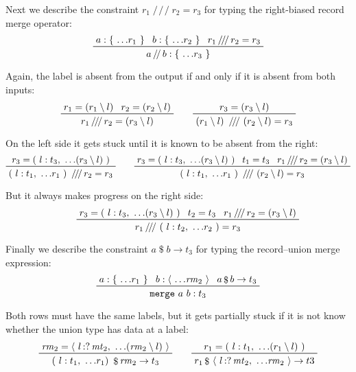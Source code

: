 \documentclass[11pt, twoside, reqno]{book}
\providecommand{\lcurvyangle}{\langle}
\providecommand{\rcurvyangle}{\rangle}
\begin{document}
Next we describe the constraint $r_1 \mathop{/\!/\!/} r_2 = r_3$ for typing the right-biased record merge operator:
\begin{displaymath}
\prftree{a : \{\ \dots\!r_1\ \}}{b : \{\ \dots\!r_2\ \}}{r_1 \mathop{/\!/\!/} r_2 = r_3}{a \mathop{/\!/} b : \{\ \dots\!r_3\ \}}
\end{displaymath}

Again, the label is absent from the output if and only if it is absent from both inputs:
\begin{displaymath}
\prftree{r_1 = (r_1 \setminus l)}{r_2 = (r_2 \setminus l)}{r_1 \mathop{/\!/\!/} r_2 = (r_3 \setminus l)}
\qquad
\prftree{r_3 = (r_3 \setminus l)}{(r_1 \setminus l)\ \mathop{/\!/\!/}\ (r_2 \setminus l) = r_3}
\end{displaymath}

On the left side it gets stuck until it is known to be absent from the right:
\begin{displaymath}
\prftree
  {r_3 = (\ l : t_3,\ \dots\!(r_3 \setminus l)\ )}
  {(\ l : t_1,\ \dots\!r_1\ )\ \mathop{/\!/\!/} r_2 = r_3}
\qquad
\prftree
  {r_3 = (\ l : t_3,\ \dots\!(r_3 \setminus l)\ )}
  {t_1 = t_3}
  {r_1 \mathop{/\!/\!/} r_2 = (r_3 \setminus l)}
  {(\ l : t_1,\ \dots\!r_1\ )\ \mathop{/\!/\!/}\ (r_2 \setminus l) = r_3}
\end{displaymath}

But it always makes progress on the right side:
\begin{displaymath}
\qquad
\prftree
  {r_3 = (\ l : t_3,\ \dots\!(r_3 \setminus l)\ )}
  {t_2 = t_3}
  {r_1 \mathop{/\!/\!/} r_2 = (r_3 \setminus l)}
  {r_1 \mathop{/\!/\!/}\ (\ l : t_2,\ \dots\!r_2\ ) = r_3}
\end{displaymath}

Finally we describe the constraint $a \mathop{\$} b \to t_3$ for typing the record--union merge expression:
\begin{displaymath}
\prftree{a : \{\ \dots\!r_1\ \}}{b : \langle\ \dots\!\mathit{rm}_2\ \rangle}{a \mathop{\$} b \to t_3}{\texttt{merge}\ a\ b : t_3}
\end{displaymath}

Both rows must have the same labels, but it gets partially stuck if it is not know whether the union type has data at a label:
\begin{displaymath}
\prftree{\mathit{rm}_2 = \lcurvyangle\ l \mathop{{:}{?}} \mathit{mt}_2,\ \dots\!(\mathit{rm}_2 \setminus l)\ \rcurvyangle}{(\ l : t_1,\ \dots\!r_1 )\ \mathop{\$} \mathit{rm}_2 \to t_3}
\qquad
\prftree{r_1 = (\ l : t_1,\ \dots\!(r_1 \setminus l)\ )}{r_1 \mathop{\$}\ \lcurvyangle\ l \mathop{{:}{?}} \mathit{mt}_2,\ \dots\!\mathit{rm}_2\ \rcurvyangle \to t3}
\end{displaymath}
\end{document}
